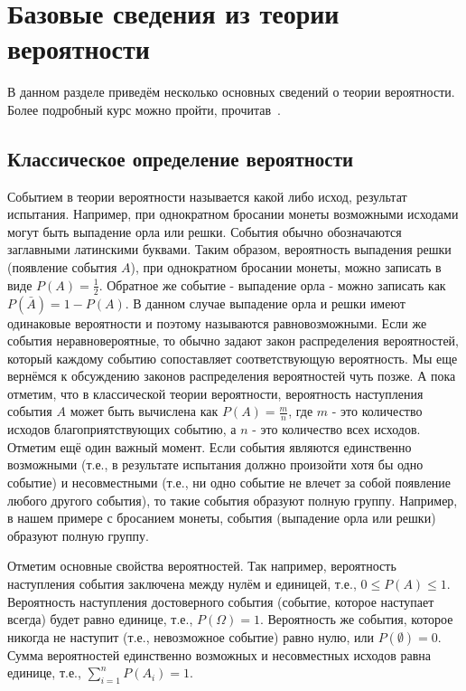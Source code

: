 \section{Базовые сведения из теории вероятности}

В данном разделе приведём несколько основных сведений о теории вероятности. 
Более подробный курс можно пройти, прочитав~\cite{turner:probability, kremer:probability}.

\subsection{Классическое определение вероятности}

Событием в теории вероятности называется какой либо исход, 
результат испытания. Например, при однократном бросании 
монеты возможными исходами могут быть выпадение орла или 
решки. События обычно обозначаются заглавными 
латинскими буквами. Таким образом, вероятность выпадения решки (появление 
события $A$), при однократном бросании монеты, можно записать в виде 
$P(A) = \frac{1}{2}$. Обратное же событие - выпадение орла - 
можно записать как $P(\bar{A})=1-P(A)$. В данном случае 
выпадение орла и решки имеют одинаковые вероятности и поэтому называются 
равновозможными. Если же события неравновероятные, то обычно 
задают закон распределения вероятностей, который каждому 
событию сопоставляет соответствующую вероятность. Мы еще вернёмся к
обсуждению законов распределения вероятностей чуть позже. А пока отметим, что 
в классической теории вероятности, вероятность наступления события $A$
может быть вычислена как $P(A)=\frac{m}{n}$, где $m$ - это 
количество исходов благоприятствующих событию, а $n$ - это количество
всех исходов. Отметим ещё один важный момент. Если события 
являются единственно возможными (т.е., в результате испытания
должно произойти хотя бы одно событие) и несовместными (т.е., ни одно 
событие не влечет за собой появление любого другого события), то такие события 
образуют полную группу. Например, в нашем примере с бросанием
монеты, события (выпадение орла или решки) образуют полную группу.

Отметим основные свойства вероятностей. Так например, вероятность 
наступления события заключена между нулём и единицей, т.е., $0 \le P(A) \le 1$.
Вероятность наступления достоверного события (событие, которое наступает
всегда) будет равно единице, т.е., $P(\Omega) = 1$. Вероятность же 
события, которое никогда не наступит (т.е., невозможное событие)
равно нулю, или $P(\emptyset)=0$. Сумма вероятностей единственно возможных и 
несовместных исходов равна единице, т.е., $\sum_{i=1}^nP(A_i)=1$.

